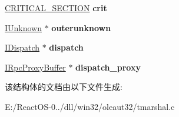 \begin{DoxyCompactItemize}
\hyperlink{struct___c_r_i_t_i_c_a_l___s_e_c_t_i_o_n}{C\+R\+I\+T\+I\+C\+A\+L\+\_\+\+S\+E\+C\+T\+I\+ON} {\bfseries crit}
\item 
\mbox{\label{struct___t_m_proxy_impl_a23b12b308e993ac294743cb0a2bbf58f}} 
\hyperlink{interface_i_unknown}{I\+Unknown} $\ast$ {\bfseries outerunknown}
\item 
\mbox{\label{struct___t_m_proxy_impl_ab7bfe265476d80c81a76691d7b779c4f}} 
\hyperlink{interface_i_dispatch}{I\+Dispatch} $\ast$ {\bfseries dispatch}
\item 
\mbox{\label{struct___t_m_proxy_impl_a77fc01dfc79439229b435d88949246c7}} 
\hyperlink{interface_i_rpc_proxy_buffer}{I\+Rpc\+Proxy\+Buffer} $\ast$ {\bfseries dispatch\+\_\+proxy}
\end{DoxyCompactItemize}


该结构体的文档由以下文件生成\+:\begin{DoxyCompactItemize}
\item 
E\+:/\+React\+O\+S-\/0../dll/win32/oleaut32/tmarshal.\+c\end{DoxyCompactItemize}
